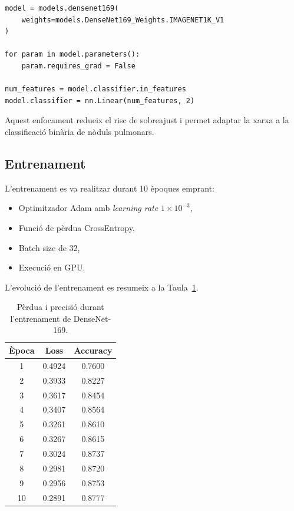 \documentclass[12pt,a4paper]{article}
\begin{document}
\begin{lstlisting}[style=mypython]
model = models.densenet169(
    weights=models.DenseNet169_Weights.IMAGENET1K_V1
)

for param in model.parameters():
    param.requires_grad = False

num_features = model.classifier.in_features
model.classifier = nn.Linear(num_features, 2)
\end{lstlisting}

Aquest enfocament redueix el risc de sobreajust i permet adaptar la xarxa a la classificació
binària de nòduls pulmonars.

\subsection{Entrenament}

L’entrenament es va realitzar durant 10 èpoques emprant:

\begin{itemize}
    \item Optimitzador Adam amb \textit{learning rate} $1 \times 10^{-3}$,
    \item Funció de pèrdua CrossEntropy,
    \item Batch size de 32,
    \item Execució en GPU.
\end{itemize}

L’evolució de l’entrenament es resumeix a la Taula~\ref{tab:densenet169_training}.

\begin{table}[h!]
\centering
\begin{tabular}{c|c|c}
\hline
\textbf{Època} & \textbf{Loss} & \textbf{Accuracy} \\
\hline
1  & 0.4924 & 0.7600 \\
2  & 0.3933 & 0.8227 \\
3  & 0.3617 & 0.8454 \\
4  & 0.3407 & 0.8564 \\
5  & 0.3261 & 0.8610 \\
6  & 0.3267 & 0.8615 \\
7  & 0.3024 & 0.8737 \\
8  & 0.2981 & 0.8720 \\
9  & 0.2956 & 0.8753 \\
10 & 0.2891 & 0.8777 \\
\hline
\end{tabular}
\caption{Pèrdua i precisió durant l’entrenament de DenseNet-169.}
\label{tab:densenet169_training}
\end{table}
\end{document}
